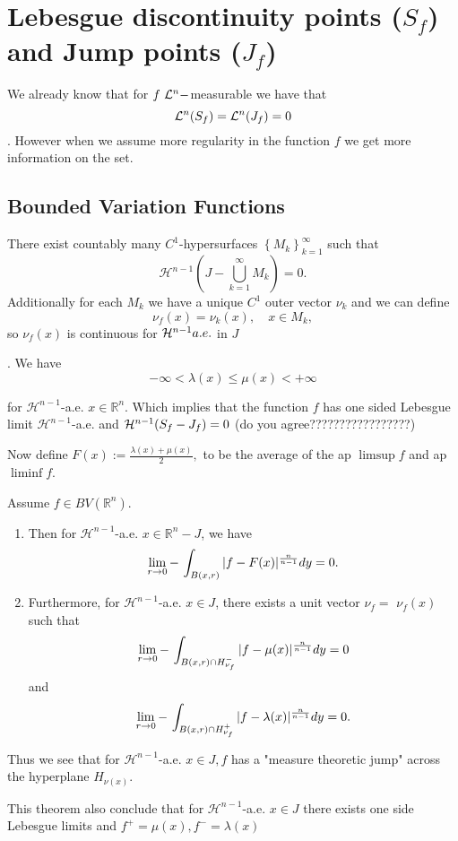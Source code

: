 \section{Lebesgue discontinuity points ($S_f$) and Jump points ($J_f$)}
We already know that for $f\ \CL^n-$measurable we have that $${\mathcal L}^n(S_f)={\mathcal L}^n(J_f)=0$$. However when we assume more regularity in the function $f$ we get more information on the set.
\subsection{Bounded Variation Functions}

\begin{theorem} There exist countably many $C^1$-hypersurfaces $\left\{M_k\right\}_{k=1}^{\infty}$ such that
$$
\mathcal{H}^{n-1}\left(J-\bigcup_{k=1}^{\infty} M_k\right)=0.
$$
Additionally for each $M_k$ we have a unique $C^1$ outer vector $\nu_k$ and we can define $$\nu_f(x)=\nu_k (x),\quad x\in M_k,$$
so $\nu_f(x)$ is continuous for ${\mathcal H}^{n-1} a.e.$ in $J$ 
\end{theorem}
\begin{theorem}. We have
$$
-\infty<\lambda(x) \leq \mu(x) <+\infty
$$

for $\mathcal{H}^{n-1}$-a.e. $x \in \mathbb{R}^n$.
Which implies that the function $f$ has one sided Lebesgue limit $\mathcal{H}^{n-1}$-a.e. and ${\mathcal H}^{n-1}(S_f-J_f)=0$ (do you agree?????????????????)
\end{theorem}
Now define  $F(x):=\frac{\lambda(x)+\mu(x)}{2},$ to be the average of the ap $\limsup f$ and ap $\liminf f$. 
\begin{theorem} Assume $f \in B V\left(\mathbb{R}^n\right)$.
\begin{enumerate}[label=(\roman*)]
    \item  Then for $\mathcal{H}^{n-1}$-a.e. $x \in \mathbb{R}^n-J$, we have 
$$
\lim _{r \rightarrow 0} \dashint_{B(x, r)}|f-F(x)|^{\frac{n}{n-1}} d y=0 .
$$
\item Furthermore, for $\mathcal{H}^{n-1}$-a.e. $x \in J$, there exists a unit vector $\nu_f=$ $\nu_f(x)$ such that
$$
\lim _{r \rightarrow 0} \dashint_{B(x, r) \cap H_{\nu_f}^{-}}|f-\mu(x)|^{\frac{n}{n-1}} d y=0
$$
and
$$
\lim _{r \rightarrow 0} \dashint_{B(x, r) \cap H_{\nu_f}^{+}}|f-\lambda(x)|^{\frac{n}{n-1}} d y=0 .
$$
\end{enumerate}
\end{theorem}
Thus we see that for $\mathcal{H}^{n-1}$-a.e. $x \in J, f$ has a "measure theoretic jump" across the hyperplane $H_{\nu(x)}$.
\begin{remark}
This theorem also conclude that for  $\mathcal{H}^{n-1}$-a.e. $x \in J$ there exists one side Lebesgue limits and $f^+=\mu(x),f^-=\lambda(x)$
\end{remark}

